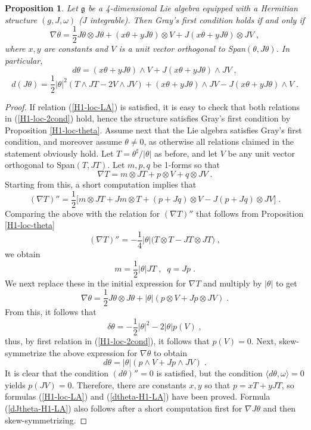 \documentclass{amsart}
\newtheorem{prop}[theorem]{Proposition}
\begin{document}
\begin{prop} \label{H1Liealg}
    Let $\mathfrak{g}$ be a 4-dimensional Lie algebra equipped with a Hermitian structure $(g,J,\omega)$ ($J$ integrable). Then Gray's first condition holds if and only if  
    \begin{equation} \label{H1-loc-LA}
   \nabla \theta = \frac{1}{2} J\theta \otimes J\theta +(x\theta +yJ\theta) \otimes V + J(x\theta +yJ\theta) \otimes JV\; , 
\end{equation} 
where $x, y$ are constants and $V$ is a unit vector orthogonal to Span$(\theta, J\theta)$.
In particular,
\begin{equation} \label{dtheta-H1-LA}
   d \theta = (x\theta +yJ\theta) \wedge V + J(x\theta +yJ\theta) \wedge JV \; , 
\end{equation} 
\begin{equation} \label{dJtheta-H1-LA}
    d (J\theta) = \frac{1}{2} |\theta|^2(T \wedge JT - 2 V \wedge JV) +(x\theta +yJ\theta) \wedge JV - J(x\theta +yJ\theta) \wedge V \; .
\end{equation}  
\end{prop}
\begin{proof} If relation (\ref{H1-loc-LA}) is satisfied, it is easy to check that both relations in (\ref{H1-loc-2cond}) hold, hence the structure satisfies Gray's first condition by Proposition \ref{H1-loc-theta}. Assume next that the Lie algebra satisfies Gray's first condition, and moreover assume $\theta \neq 0$, as otherwise all relations claimed in the statement obviously hold. Let $T = \theta^{\sharp}/|\theta|$ as before, and let $V$ be any unit vector orthogonal to 
Span$(T, JT)$. Let $m, p, q$ be 1-forms so that
$$ \nabla T = m \otimes JT + p \otimes V + q \otimes JV \; .$$
Starting from this, a short computation implies that
$$ (\nabla T)'' = \frac{1}{2} \Big[ m \otimes JT + Jm \otimes T + (p +Jq) \otimes V -J(p+Jq) \otimes JV\Big] \; .$$
Comparing the above with the relation for $(\nabla T)''$ that follows from Proposition \ref{H1-loc-theta}
$$ (\nabla T)'' = -\frac{1}{4} |\theta| \big( T \otimes T - JT \otimes JT \big) \; , $$
we obtain
$$ m = \frac{1}{2}|\theta| JT \; , \; \; q =Jp \; .$$
We next replace these in the initial expression for $\nabla T$ and multiply by $|\theta|$ to get 
$$\nabla \theta = \frac{1}{2} J\theta \otimes J\theta + |\theta| (p \otimes V + Jp \otimes JV) \; .$$
From this, it follows that
$$\delta \theta = -\frac{1}{2} |\theta|^2 - 2 |\theta| p(V) \; ,$$
thus, by first relation in (\ref{H1-loc-2cond}), it follows that $p(V) = 0$.
Next, skew-symmetrize the above expression for $\nabla \theta$ to obtain
$$ d \theta = |\theta| ( p \wedge V + Jp \wedge JV) \; .$$
It is clear that the condition $(d \theta)'' = 0$ is satisfied, but the condition $\langle d\theta , \omega \rangle= 0$ yields $p(JV) = 0$.
Therefore, there are constants $x, y$ so that $ p =x T + yJT$, so formulas 
(\ref{H1-loc-LA}) and (\ref{dtheta-H1-LA}) have been proved. Formula (\ref{dJtheta-H1-LA}) also follows after a short computation first for $\nabla J\theta$ and then skew-symmetrizing.
\end{proof}
\end{document}
